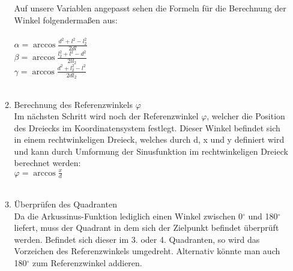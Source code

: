 \begin{itemize}
\begin{enumerate}
Auf unsere Variablen angepasst sehen die Formeln für die Berechnung der Winkel folgendermaßen aus:\\
\\
$ \alpha = \arccos \frac{d^2 + l^2 - l_2^2}{2dl} $\\
$ \beta = \arccos \frac{l_2^2 + l^2 - d^2}{2ll_2} $\\
$ \gamma = \arccos \frac{d^2 + l_2^2 - l^2}{2dl_2} $\\
\\
\item Berechnung des Referenzwinkels $\varphi$\\
Im nächsten Schritt wird noch der Referenzwinkel $\varphi$, welcher die Position des Dreiecks im Koordinatensystem festlegt. Dieser Winkel befindet sich in einem rechtwinkeligen Dreieck, welches durch d, x und y definiert wird und kann durch Umformung der Sinusfunktion im rechtwinkeligen Dreieck berechnet werden:\\
$ \varphi = \arccos \frac{x}{d} $\\
\\
\item Überprüfen des Quadranten\\
Da die Arkussinus-Funktion lediglich einen Winkel zwischen 0$^\circ$ und 180$^\circ$ liefert, muss der Quadrant in dem sich der Zielpunkt befindet überprüft werden. Befindet sich dieser im 3. oder 4. Quadranten, so wird das Vorzeichen des Referenzwinkels umgedreht. Alternativ könnte man auch 180$^\circ$ zum Referenzwinkel addieren.
\end{enumerate}
\end{itemize}
